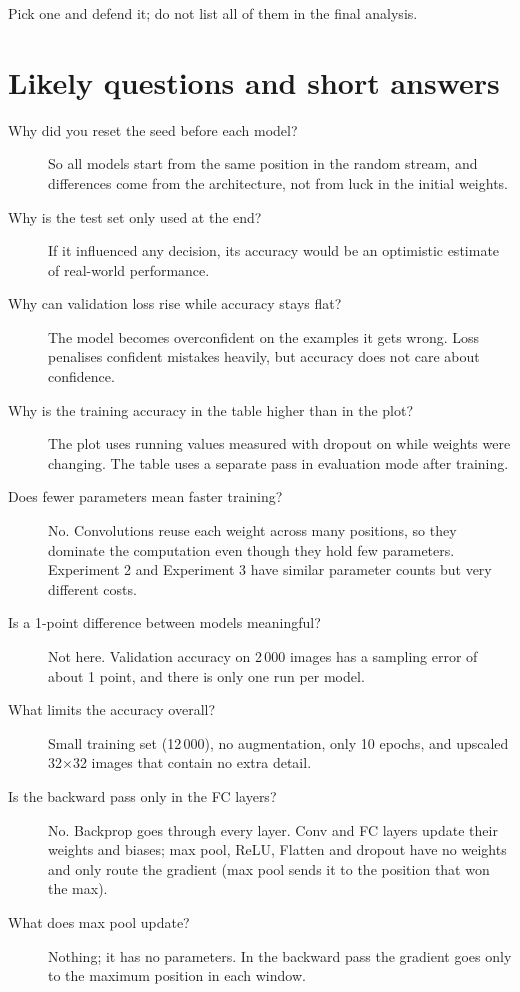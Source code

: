 \documentclass[11pt]{article}
\begin{document}
Pick one and defend it; do not list all of them in the final analysis.

\section{Likely questions and short answers}

\begin{description}
\item[Why did you reset the seed before each model?] So all models start from the same position in the random stream, and differences come from the architecture, not from luck in the initial weights.
\item[Why is the test set only used at the end?] If it influenced any decision, its accuracy would be an optimistic estimate of real-world performance.
\item[Why can validation loss rise while accuracy stays flat?] The model becomes overconfident on the examples it gets wrong. Loss penalises confident mistakes heavily, but accuracy does not care about confidence.
\item[Why is the training accuracy in the table higher than in the plot?] The plot uses running values measured with dropout on while weights were changing. The table uses a separate pass in evaluation mode after training.
\item[Does fewer parameters mean faster training?] No. Convolutions reuse each weight across many positions, so they dominate the computation even though they hold few parameters. Experiment 2 and Experiment 3 have similar parameter counts but very different costs.
\item[Is a 1-point difference between models meaningful?] Not here. Validation accuracy on 2\,000 images has a sampling error of about 1 point, and there is only one run per model.
\item[What limits the accuracy overall?] Small training set (12\,000), no augmentation, only 10 epochs, and upscaled 32$\times$32 images that contain no extra detail.
\item[Is the backward pass only in the FC layers?] No. Backprop goes through every layer. Conv and FC layers update their weights and biases; max pool, ReLU, Flatten and dropout have no weights and only route the gradient (max pool sends it to the position that won the max).
\item[What does max pool update?] Nothing; it has no parameters. In the backward pass the gradient goes only to the maximum position in each window.

\end{description}
\end{document}
